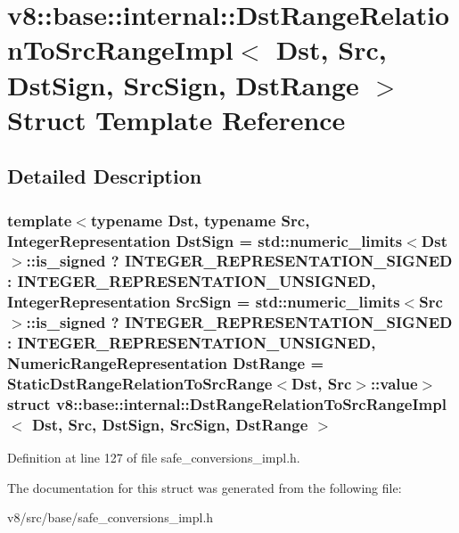 \hypertarget{structv8_1_1base_1_1internal_1_1DstRangeRelationToSrcRangeImpl}{}\section{v8\+:\+:base\+:\+:internal\+:\+:Dst\+Range\+Relation\+To\+Src\+Range\+Impl$<$ Dst, Src, Dst\+Sign, Src\+Sign, Dst\+Range $>$ Struct Template Reference}
\label{structv8_1_1base_1_1internal_1_1DstRangeRelationToSrcRangeImpl}


\subsection{Detailed Description}
\subsubsection*{template$<$typename Dst, typename Src, Integer\+Representation Dst\+Sign = std\+::numeric\+\_\+limits$<$\+Dst$>$\+::is\+\_\+signed ? I\+N\+T\+E\+G\+E\+R\+\_\+\+R\+E\+P\+R\+E\+S\+E\+N\+T\+A\+T\+I\+O\+N\+\_\+\+S\+I\+G\+N\+E\+D \+: I\+N\+T\+E\+G\+E\+R\+\_\+\+R\+E\+P\+R\+E\+S\+E\+N\+T\+A\+T\+I\+O\+N\+\_\+\+U\+N\+S\+I\+G\+N\+ED, Integer\+Representation Src\+Sign = std\+::numeric\+\_\+limits$<$\+Src$>$\+::is\+\_\+signed ? I\+N\+T\+E\+G\+E\+R\+\_\+\+R\+E\+P\+R\+E\+S\+E\+N\+T\+A\+T\+I\+O\+N\+\_\+\+S\+I\+G\+N\+E\+D \+: I\+N\+T\+E\+G\+E\+R\+\_\+\+R\+E\+P\+R\+E\+S\+E\+N\+T\+A\+T\+I\+O\+N\+\_\+\+U\+N\+S\+I\+G\+N\+ED, Numeric\+Range\+Representation Dst\+Range = Static\+Dst\+Range\+Relation\+To\+Src\+Range$<$\+Dst, Src$>$\+::value$>$\newline
struct v8\+::base\+::internal\+::\+Dst\+Range\+Relation\+To\+Src\+Range\+Impl$<$ Dst, Src, Dst\+Sign, Src\+Sign, Dst\+Range $>$}



Definition at line 127 of file safe\+\_\+conversions\+\_\+impl.\+h.



The documentation for this struct was generated from the following file\+:\begin{DoxyCompactItemize}
\item 
v8/src/base/safe\+\_\+conversions\+\_\+impl.\+h\end{DoxyCompactItemize}
